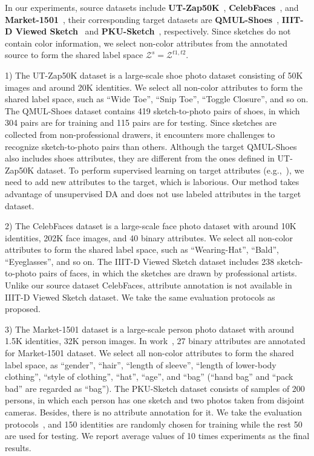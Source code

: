 \documentclass[journal]{IEEEtran}
\begin{document}
In our experiments, source datasets include \textbf{UT-Zap50K}~\cite{semjitter}, \textbf{CelebFaces}~\cite{liu2015faceattributes}, and \textbf{Market-1501}~\cite{zheng2015scalable}, their corresponding target datasets are \textbf{QMUL-Shoes}~\cite{yu2016sketch}, \textbf{IIIT-D Viewed Sketch}~\cite{bhatt2012memetically} and \textbf{PKU-Sketch}~\cite{pang2018cross}, respectively. Since sketches do not contain color information, we select non-color attributes from the annotated source to form the shared label space $\mathcal{Z}^{s}=\mathcal{Z}^{t1,t2}$.


1) The UT-Zap50K dataset is a large-scale shoe photo dataset consisting of 50K images and around 20K identities. We select all non-color attributes to form the shared label space, such as ``Wide Toe'', ``Snip Toe'', ``Toggle Closure'', and so on. The QMUL-Shoes dataset contains 419 sketch-to-photo pairs of shoes, in which 304 pairs are for training and 115 pairs are for testing. Since sketches are collected from non-professional drawers, it encounters more challenges to recognize sketch-to-photo pairs than others. Although the target QMUL-Shoes also includes shoes attributes, they are different from the ones defined in UT-Zap50K dataset. To perform supervised learning on target attributes (e.g.,~\cite{liu2018deep}), we need to add new attributes to the target, which is laborious. Our method takes advantage of unsupervised DA and does not use labeled attributes in the target dataset.

2) The CelebFaces dataset is a large-scale face photo dataset with around 10K identities, 202K face images, and 40 binary attributes. We select all non-color attributes to form the shared label space, such as ``Wearing-Hat'', ``Bald'', ``Eyeglasses'', and so on. The IIIT-D Viewed Sketch dataset includes 238 sketch-to-photo pairs of faces, in which the sketches are drawn by professional artists. Unlike our source dataset CelebFaces, attribute annotation is not available in IIIT-D Viewed Sketch dataset. We take the same evaluation protocols as~\cite{wu2018light,deng2019residual} proposed.

3) The Market-1501 dataset is a large-scale person photo dataset with around 1.5K identities, 32K person images. In work~\cite{lin2019improving,wang2019learning}, 27 binary attributes are annotated for Market-1501 dataset. We select all non-color attributes to form the shared label space, as ``gender'', ``hair'', ``length of sleeve'', ``length of lower-body clothing'', ``style of clothing'', ``hat'', ``age'', and ``bag'' (``hand bag'' and ``pack bad'' are regarded as ``bag''). The PKU-Sketch dataset consists of samples of 200 persons, in which each person has one sketch and two photos taken from disjoint cameras. Besides, there is no attribute annotation for it. We take the evaluation protocols~\cite{pang2018cross}, and 150 identities are randomly chosen for training while the rest 50 are used for testing. We report average values of 10 times experiments as the final results.
\end{document}
